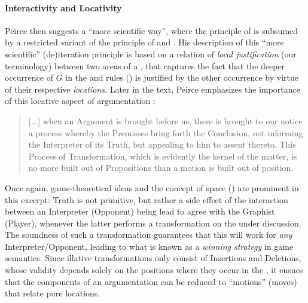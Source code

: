 \begin{scope}
\paragraph{Interactivity and Locativity}

Peirce then suggests a ``more scientific way'', where the principle of
 is subsumed by a restricted variant of the principle of
 and . His description of this ``more
scientific'' (de)iteration principle is based on a relation of \emph{local
justification} (our terminology) between two areas of a , that captures the
fact that the deeper occurrence of $G$ in the  and  rules
() is justified by the other occurrence by virtue of their
respective \emph{locations}. Later in the text, Peirce emphasizes the importance
of this locative aspect of argumentation
\cite[pp.~544--545]{peirce_prolegomena_1906}:

\begin{quote}
  [...] when an Argument is brought before us, there is brought to our notice a
process whereby the Premisses bring forth the Conclusion, not informing the
Interpreter of its Truth, but appealing to him to assent thereto. This Process
of Transformation, which is evidently the kernel of the matter, is no more built
out of Propositions than a motion is built out of position.
\end{quote}

Once again, game-theoretical ideas and the concept of space
() are prominent in this excerpt: Truth is not primitive,
but rather a side effect of the interaction between an Interpreter (Opponent)
being lead to agree with the Graphist (Player), whenever the latter performs a
transformation on the  under discussion. The soundness of such a
transformation guarantees that this will work for \emph{any}
Interpreter/Opponent, leading to what is known as a \emph{winning strategy} in
game semantics. Since illative transformations only consist of Insertions and
Deletions, whose validity depends solely on the positions where they occur in
the , it ensues that the components of an argumentation can be reduced to
``motions'' (moves) that relate pure locations.


\end{scope}
